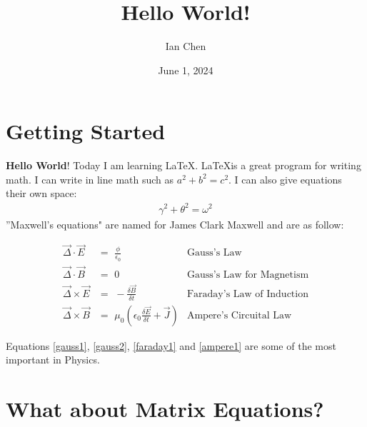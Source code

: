 \documentclass{article}
\title{Hello World!}
\author{Ian Chen}
\date{June 1, 2024}
\begin{document}
\maketitle

\section{Getting Started}
\textbf{Hello World}! Today I am learning \LaTeX. \LaTeX is a great program for writing math. I can write in line math such as $a^2+b^2=c^2$. I can also give equations their own space:
\begin{align}
    \gamma^2+\theta^2=\omega^2
\end{align}
''Maxwell's equations" are named for James Clark Maxwell and are as follow:

\begin{align}
\Vec{\Delta} \cdot \Vec{E} &= \,\,\frac{\phi}{\epsilon_0}  &\text{Gauss's Law} \label{gauss1}\\
\Vec{\Delta} \cdot \Vec{B} &= \,\,0 &\text{Gauss's Law for Magnetism} \label{gauss2}\\
\Vec{\Delta} \times \Vec{E} &= \,\,-\frac{\delta \Vec{B}}{\delta t} &\text{Faraday's Law of Induction} \label{faraday1}\\
\Vec{\Delta} \times \Vec{B} &= \,\,\mu_0 \left(\epsilon_0 \frac{\delta \Vec{E}}{\delta t} + \Vec{J}\right) &\text{Ampere's Circuital Law} \label{ampere1}
\end{align}

Equations \ref{gauss1}, \ref{gauss2}, \ref{faraday1} and \ref{ampere1} are some of the most important in Physics.

\section{What about Matrix Equations?}
\end{document}
